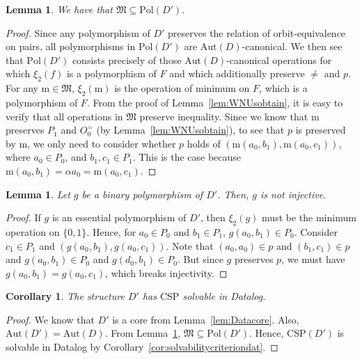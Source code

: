 \documentclass{article}
\newtheorem{corollary}[theorem]{Corollary}
\newtheorem{lemma}[theorem]{Lemma}
\theoremstyle{remark}
\theoremstyle{definition}
\begin{document}
\begin{lemma}\label{lem:containment} We have that $\mathfrak{M}\subseteq \mathrm{Pol}(D')$. 
\end{lemma}
\begin{proof} Since any polymorphism of $D'$ preserves the relation of orbit-equivalence on pairs, all polymorphisms in $\mathrm{Pol}(D')$ are $\mathrm{Aut}(D)$-canonical. We then see that  $\mathrm{Pol}(D')$ consists precisely of those $\mathrm{Aut}(D)$-canonical operations for which $\xi_2(f)$ is a polymorphism of $F$ and which additionally preserve $\neq$ and $p$. 
For any $\mathrm{m}\in\mathfrak{M}$, $\xi_2(\mathrm{m})$ is the operation of minimum on $F$, which is a polymorphism of $F$.  From the proof of  Lemma~\ref{lem:WNUsobtain}, it is easy to verify that all operations in $\mathfrak{M}$ preserve inequality. 
Since we know that $\mathrm{m}$ preserves $P_1$ and $O_{0}^=$ (by Lemma~\ref{lem:WNUsobtain}), to see that $p$ is preserved by $\mathrm{m}$, we only need to consider whether $p$ holds of $(\mathrm{m}(a_0, b_1), \mathrm{m}(a_0, c_1))$, where $a_0\in P_0$, and $b_1, c_1\in P_1$. This is the case because $\mathrm{m}(a_0, b_1)=\alpha a_0=\mathrm{m}(a_0, c_1)$.
\end{proof}








\begin{lemma}\label{lem:bininj}
  Let $g$ be a binary polymorphism of $D'$. Then, $g$ is not injective.
\end{lemma}
\begin{proof} If $g$ is an essential polymorphism of $D'$, then $\xi_2(g)$ must be the minimum operation on $\{0,1\}$. Hence, for $a_0\in P_0$ and $b_1\in P_1$, $g(a_0, b_1)\in P_0$.
Consider $c_1\in P_1$ and $(g(a_0, b_1), g(a_0, c_1))$. Note that $(a_0, a_0)\in p$ and $(b_1, c_1)\in p$ and $g(a_0, b_1)\in P_0$ and $g(d_0, b_1)\in P_0$. But since $g$ preserves $p$, we must have $g(a_0, b_1)=g(a_0, c_1)$, which breaks injectivity.
\end{proof}

\begin{corollary} \label{cor:WNUprogram} The structure $D'$ has $\mathrm{CSP}$ solvable in Datalog.
\end{corollary}
\begin{proof} We know that $D'$ is a core from Lemma~\ref{lem:Datacore}. Also, $\mathrm{Aut}(D')=\mathrm{Aut}(D)$. From Lemma~\ref{lem:containment}, $\mathfrak{M}\subseteq\mathrm{Pol}(D')$. Hence, $\mathrm{CSP}(D')$ is solvable in Datalog by Corollary~\ref{cor:solvabilitycriteriondat}.
\end{proof}
\end{document}
